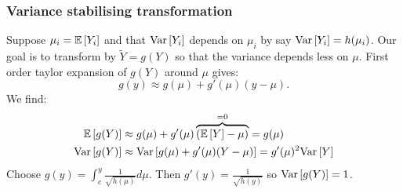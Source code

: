 \subsubsection{Variance stabilising transformation}

Suppose $\mu_i=\mathbb{E}\left[Y_i\right]$ and that $\mathrm{Var}\left[Y_i\right]$ depends on $\mu_i$ by say $\mathrm{Var}\left[Y_i\right]=h(\mu_i)$. Our goal is to transform by $\tilde{Y} = g(Y)$ so that the variance depends less on $\mu$. First order taylor expansion of $g(Y)$ around $\mu$ gives:
$$
    g(y) \approx g(\mu) + g'(\mu)(y-\mu).
$$ 
We find:
\begin{align*}
    \mathbb{E}\left[g(Y)\right] &\approx g(\mu) + g'(\mu)\overbrace{(\mathbb{E}\left[Y\right]-\mu )}^{=0} = g(\mu) 
    \\
    \mathrm{Var}\left[g(Y)\right] &\approx \mathrm{Var}\left[g(\mu) + g'(\mu)(Y-\mu)\right] = g'(\mu)^2\mathrm{Var}\left[Y\right] 
\end{align*}
Choose $g(y)=\int_c^y \frac{1}{\sqrt{h(\mu)}}d\mu$. Then $g'(y) = \frac{1}{\sqrt{h(y)}}$ so $\mathrm{Var}\left[g(Y)\right] = 1$.
